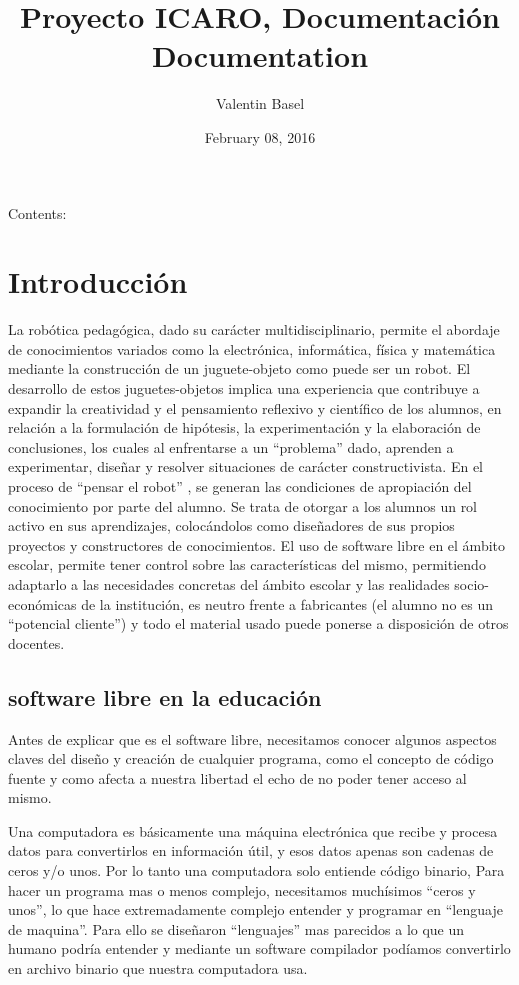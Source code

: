 \documentclass[letterpaper,10pt,english]{sphinxmanual}
\title{Proyecto ICARO, Documentación Documentation}
\date{February 08, 2016}
\author{Valentin Basel}
\begin{document}
\maketitle
\tableofcontents
{}\label{index::doc}


Contents:


\chapter{Introducción}
\label{introduccion:introduccion}\label{introduccion:welcome-to-proyecto-icaro-documentacion-s-documentation}\label{introduccion::doc}
La robótica pedagógica, dado su carácter multidisciplinario, permite el
abordaje de conocimientos variados como la electrónica, informática,
física y matemática mediante la construcción de un juguete-objeto
como puede ser un robot. El desarrollo de estos juguetes-objetos
implica una experiencia que contribuye a expandir la creatividad y el
pensamiento reflexivo y científico de los alumnos,
en relación a la formulación de hipótesis, la
experimentación y la elaboración de conclusiones, los cuales al
enfrentarse a un “problema” dado, aprenden a experimentar, diseñar y
resolver situaciones de carácter constructivista. En el proceso de
“pensar el robot” , se generan las condiciones de apropiación
del conocimiento por parte del alumno.
Se trata de otorgar a los alumnos un rol activo en sus aprendizajes,
colocándolos como diseñadores de sus propios proyectos y constructores
de conocimientos. El uso de software libre en el ámbito escolar,
permite tener control sobre las características del mismo,
permitiendo adaptarlo a las necesidades concretas del ámbito escolar
y las realidades socio-económicas de la institución, es neutro frente
a fabricantes (el alumno no es un “potencial cliente”) y todo el
material usado puede ponerse a disposición de otros docentes.


\section{software libre en la educación}
\label{introduccion:software-libre-en-la-educacion}
Antes de explicar que es el software libre,
necesitamos conocer algunos aspectos claves del diseño y
creación de cualquier programa, como el concepto de código fuente y
como afecta a nuestra libertad el echo de no poder tener acceso al mismo.

Una computadora es básicamente una máquina electrónica que recibe y
procesa datos para convertirlos en información útil, y esos datos
apenas son cadenas de ceros y/o unos. Por lo tanto una computadora
solo entiende código binario, Para hacer
un programa mas o menos complejo, necesitamos muchísimos “ceros y unos”,
lo que hace extremadamente complejo entender y programar en
“lenguaje de maquina”. Para ello se diseñaron “lenguajes” mas parecidos
a lo que un humano podría entender y mediante un software
compilador podíamos convertirlo en archivo binario que nuestra
computadora usa.
\end{document}
